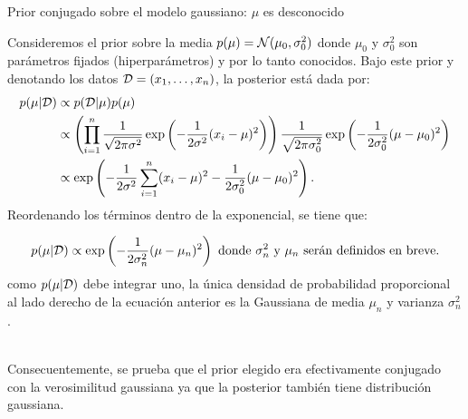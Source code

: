 \documentclass[9pt, handout]{beamer}
\begin{document}
\begin{frame}{Prior conjugado sobre el modelo gaussiano: $\mu$ es desconocido}

Consideremos el prior sobre la media $p(\mu) = {\mathcal N}(\mu_0,\sigma_0^2)$ donde $\mu_0$ y $\sigma^2_0$ son parámetros fijados (hiperparámetros) y por lo tanto conocidos. Bajo este prior y denotando los datos ${\mathcal D} = (x_1,\ldots,x_n)$, la posterior está dada por:
 \begin{align*}
 	p(\mu|{\mathcal D})& \propto p({\mathcal D}|\mu)p(\mu)\\
 	& \propto \left(\prod_{i=1}^n \frac{1}{\sqrt{2\pi\sigma^2}}\exp\left(-\frac{1}{2\sigma^2}(x_i-\mu)^2\right) \right)\frac{1}{\sqrt{2\pi\sigma_0^2}}\exp\left(-\frac{1}{2\sigma_0^2}(\mu-\mu_0)^2\right)\\
 	&\propto \exp\left(-\frac{1}{2\sigma^2}\sum_{i=1}^n(x_i-\mu)^2-\frac{1}{2\sigma_0^2}(\mu-\mu_0)^2\right).
 \end{align*} 
 \pause
 Reordenando los términos dentro de la exponencial, se tiene que:
 
 \begin{equation*}
 	p(\mu|{\mathcal D}) \propto \exp\left(-\frac{1}{2\sigma_n^2}(\mu - \mu_n)^2\right) \text{ donde $\sigma_n^2$ y $\mu_n$ serán definidos en breve.}
 	\end{equation*} 
\pause
como $p(\mu|{\mathcal D})$ debe integrar uno, la única densidad de probabilidad proporcional al lado derecho de la ecuación anterior es la Gaussiana de media $\mu_n$ y varianza $\sigma_n^2$.\\~\ \pause

Consecuentemente, se prueba que el prior elegido era efectivamente conjugado con la verosimilitud gaussiana ya que la posterior también tiene distribución gaussiana.

\end{frame}
\end{document}
